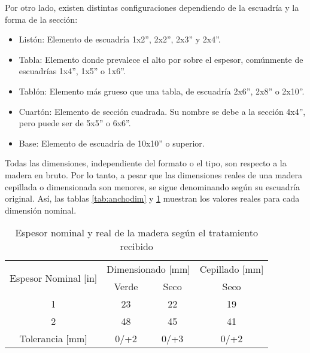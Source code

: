 Por otro lado, existen distintas configuraciones dependiendo de la escuadría y la forma de la sección:
\begin{itemize}
	\item Listón: Elemento de escuadría 1x2'', 2x2'', 2x3'' y 2x4''.
	\item Tabla: Elemento donde prevalece el alto por sobre el espesor, comúnmente de escuadrías 1x4'', 1x5'' o 1x6''.
	\item Tablón: Elemento más grueso que una tabla, de escuadría 2x6'', 2x8'' o 2x10''.
	\item Cuartón: Elemento de sección cuadrada. Su nombre se debe a la sección 4x4'', pero puede ser de 5x5'' o 6x6''.
	\item Base: Elemento de escuadría de 10x10'' o superior. 
\end{itemize}

Todas las dimensiones, independiente del formato o el tipo, son respecto a la madera en bruto. Por lo tanto, a pesar que las dimensiones reales de una madera cepillada o dimensionada son menores, se sigue denominando según su escuadría original. Así, las tablas \ref{tab:anchodim} y \ref{tab:espdim} muestran los valores reales para cada dimensión nominal.

\begin{table}[H]
\centering
\begin{tabular}{@{}cccc@{}}
\toprule
\multirow{2}{*}{Espesor Nominal {[}in{]}} & \multicolumn{2}{c}{Dimensionado {[}mm{]}} & Cepillado {[}mm{]} \\ \cmidrule(l){2-4} 
                                  & Verde                & Seco               & Seco               \\ \midrule
1                                 & 23                   & 22                 & 19                 \\
2                                 & 48                   & 45                 & 41                 \\ \midrule
Tolerancia {[}mm{]}               & 0/+2                 & 0/+3               & 0/+2               \\ \bottomrule
\end{tabular}
\caption{Espesor nominal y real de la madera según el tratamiento recibido}
\label{tab:espdim}
\end{table}

